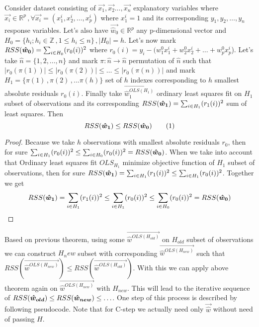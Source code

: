 \begin{veta}
Consider dataset consisting of
$\vec{x_1}, \vec{x_2} \ldots,\vec{x_n}$ explanatory variables where 
$\vec{x_i}\in\mathbb{R}^p\,, \forall \vec{x_i} = (x^i_1, x^i_2,\ldots,x^i_p)$ where $x^i_1 = 1$
and its corresponding $y_1, y_2,\ldots,y_n$ response variables. 
Let's also have $\vec{\hat{w}_0}\in\mathbb{R}^p$ any p-dimensional vector and 
$H_0 = \{{h_i ; h_i \in\mathbb{Z}\,, 1 \leq h_i \leq n\}}\,, |H_0| = h$. 
Let's now mark $RSS(\boldsymbol{\hat{w}_0}) = \sum_{i\in H_0} (r_0(i))^2$ where 
$r_0(i) = y_i - (w_1^0x^i_1 + w_2^0x^i_2 +\ldots+ w_p^0x^i_p$).
Let's take $\hat{n} = \{{1,2,\ldots,n\}}$ and mark
$\pi: \hat{n} \rightarrow \hat{n}$ permutation of $\hat{n}$ such that $|r_0({\pi(1)})| \leq |r_0({\pi(2)})| \leq \ldots \leq |r_0({\pi(n)})|$
and mark $H_1 = \{{\pi(1)\,, \pi(2)\,,... \pi(h)\}}$ set of $h$ indexes corresponding to $h$ smallest absolute residuals $r_0(i)$.
Finally take $\vec{\hat{w}^{OLS(H_1)}_1 }$ ordinary least squares fit on $H_1$ subset of observations
and its corresponding $RSS(\boldsymbol{\hat{w}_1}) = \sum_{i\in H_1} (r_1(i))^2$ sum of least squares. Then
\[ 
	RSS(\what{1}) \leq RSS(\what{0}) \numberthis
\]
\end{veta}

\begin{proof}
	Because we take $h$ observations with smallest absolute residuals $r_0$, then for sure $\sum_{i\in H_1} (r_0(i))^2 \leq \sum_{i\in H_0} (r_0(i))^2 =  RSS(\boldsymbol{\hat{w}_0})$.
	When we take into account that Ordinary least squares fit $OLS_{H_1}$ minimize objective function of 
	$H_1$ subset of observations, then for sure  $RSS(\boldsymbol{\hat{w}_1}) =  \sum_{i\in H_1} (r_1(i))^2 \leq \sum_{i\in H_1} (r_0(i))^2$.
	Together we get $$RSS(\boldsymbol{\hat{w}_1})=\sum_{i\in H_1}(r_1(i))^2\leq\sum_{i\in H_1}(r_0(i))^2\leq\sum_{i\in H_0}(r_0(i))^2=RSS(\boldsymbol{\hat{w}_0})$$
\end{proof}

\begin{corollary} 
	Based on previous theorem, using some $\vec{\hat{w}^{OLS(H_{old})}}$  on $H_{old}$ subset of observations we can
	construct $H_new$ subset with corresponding $\vec{\hat{w}^{OLS(H_{new})}}$ such that $RSS(\vec{\hat{w}^{OLS(H_{new})}}) \leq RSS(\vec{\hat{w}^{OLS(H_{old})}})$. 
	With this we can apply above theorem again on $\vec{\hat{w}^{OLS(H_{new})}}$ with $H_{new}$. This will lead to the iterative sequence of
	 $RSS(\boldsymbol{\hat{w}_{old}}) \leq RSS(\boldsymbol{\hat{w}_{new}}) \leq \ldots$. One step of this process is described by following pseudocode. Note that for C-step we actually need only $\vec{\hat{w}}$ 
	 without need of passing  $H$.
\end{corollary}

